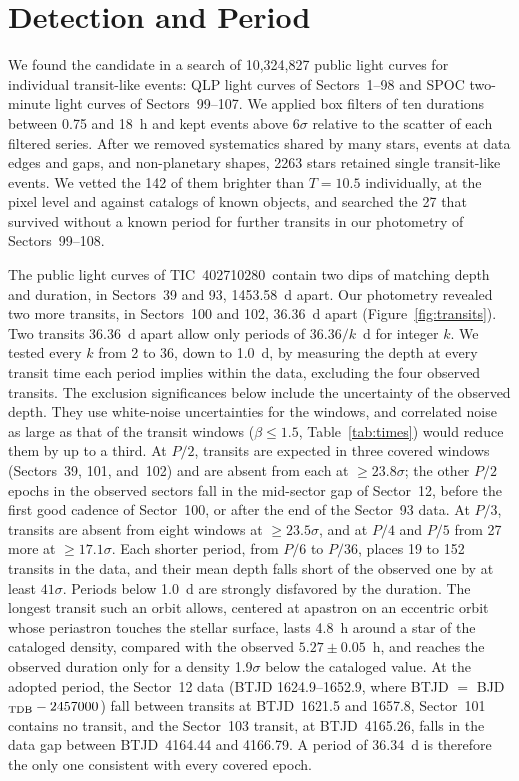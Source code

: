 \documentclass[twocolumn,linenumbers]{aastex701}
\newcommand{\tic}{TIC~402710280}
\begin{document}
\section{Detection and Period} \label{sec:period}

We found the candidate in a search of 10,324,827 public light curves for individual transit-like events: QLP light curves of Sectors~1--98 and SPOC two-minute light curves \citep{TESSLC} of Sectors~99--107. We applied box filters of ten durations between 0.75 and 18~h and kept events above $6\sigma$ relative to the scatter of each filtered series. After we removed systematics shared by many stars, events at data edges and gaps, and non-planetary shapes, 2263 stars retained single transit-like events. We vetted the 142 of them brighter than $T = 10.5$ individually, at the pixel level and against catalogs of known objects, and searched the 27 that survived without a known period for further transits in our photometry of Sectors~99--108.

The public light curves of \tic\ contain two dips of matching depth and duration, in Sectors~39 and 93, 1453.58~d apart. Our photometry revealed two more transits, in Sectors~100 and 102, 36.36~d apart (Figure~\ref{fig:transits}). Two transits 36.36~d apart allow only periods of $36.36/k$~d for integer $k$. We tested every $k$ from 2 to 36, down to 1.0~d, by measuring the depth at every transit time each period implies within the data, excluding the four observed transits. The exclusion significances below include the uncertainty of the observed depth. They use white-noise uncertainties for the windows, and correlated noise as large as that of the transit windows ($\beta \leq 1.5$, Table~\ref{tab:times}) would reduce them by up to a third. At $P/2$, transits are expected in three covered windows (Sectors~39, 101, and~102) and are absent from each at $\geq 23.8\sigma$; the other $P/2$ epochs in the observed sectors fall in the mid-sector gap of Sector~12, before the first good cadence of Sector~100, or after the end of the Sector~93 data. At $P/3$, transits are absent from eight windows at $\geq 23.5\sigma$, and at $P/4$ and $P/5$ from 27 more at $\geq 17.1\sigma$. Each shorter period, from $P/6$ to $P/36$, places 19 to 152 transits in the data, and their mean depth falls short of the observed one by at least $41\sigma$. Periods below 1.0~d are strongly disfavored by the duration. The longest transit such an orbit allows, centered at apastron on an eccentric orbit whose periastron touches the stellar surface, lasts 4.8~h around a star of the cataloged density, compared with the observed $5.27 \pm 0.05$~h, and reaches the observed duration only for a density 1.9$\sigma$ below the cataloged value. At the adopted period, the Sector~12 data (BTJD 1624.9--1652.9, where BTJD $=$ BJD$_{\rm TDB} - 2457000$) fall between transits at BTJD~1621.5 and 1657.8, Sector~101 contains no transit, and the Sector~103 transit, at BTJD~4165.26, falls in the data gap between BTJD~4164.44 and 4166.79. A period of 36.34~d is therefore the only one consistent with every covered epoch.
\end{document}
